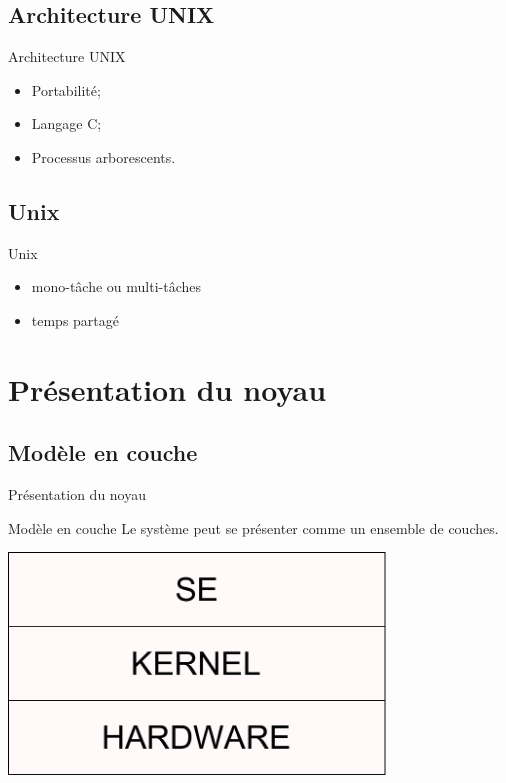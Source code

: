 \begin{frame}{\sectitle}

\def\subsectitle{Architecture UNIX}
\subsection{\subsectitle}

\begin{block}{\subsectitle}
\begin{itemize}
    \item Portabilité;
    \item Langage C;
    \item Processus arborescents.
\end{itemize}
\end{block}

\def\subsectitle{Unix}
\subsection{\subsectitle}

\begin{block}{\subsectitle}
\begin{itemize}
\item mono-tâche ou multi-tâches
\item temps partagé
\end{itemize}
\end{block}

\end{frame}


\def\sectitle{Présentation du noyau}
\section{\sectitle}
\def\subsectitle{Modèle en couche}
\subsection{\subsectitle}

\begin{frame}{\sectitle}
\begin{block}{\subsectitle}
Le système peut se présenter comme un ensemble de couches.
\end{block}

\begin{center}
\includegraphics[width=0.75\textwidth]{images/Couches.pdf}
\end{center}

\end{frame}




